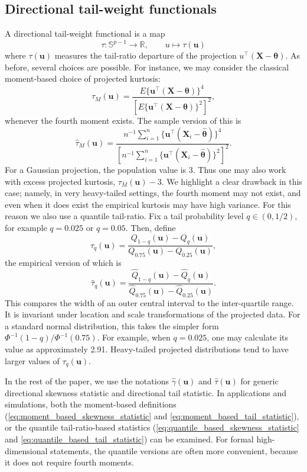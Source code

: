\documentclass[11pt]{article}
\theoremstyle{plain}
\theoremstyle{definition}
\theoremstyle{remark}
\def\X{\bm{X}}
\def\u{\bm{u}}
\newcommand{\boldtheta}{\bm{\theta}}
\begin{document}
\subsection{Directional tail-weight functionals}
\label{subsec:directional-tail}

A directional tail-weight functional is a map
\[
\tau:\mathbb{S}^{p-1}\to\mathbb R, \qquad u\mapsto \tau(\u)
\]
where \(\tau(\u)\) measures the tail-ratio departure of the projection
\(u^\top(\X-\boldtheta)\). As before, several choices are possible. For instance, we may consider the classical moment-based choice of projected kurtosis:
\[
\tau_{M}(\u)
=
\frac{
	E\{\u^\top(\X-\boldtheta)\}^4
}{
	\left[E\{\u^\top(\X-\boldtheta)\}^2\right]^2
},
\]
whenever the fourth moment exists. The sample version of this is
\begin{equation}
\label{eq:moment_based_tail_statistic}
    \widehat\tau_{M}(\u) = \frac{n^{-1}\sum_{i=1}^n \{\u^\top(\X_i-\widehat{\boldtheta})\}^4}
    {\left[n^{-1}\sum_{i=1}^n \{\u^\top(\X_i-\widehat{\boldtheta})\}^2\right]^2}.
\end{equation}
For a Gaussian projection, the population value is \(3\). Thus one may also work with excess projected kurtosis, \(\tau_{M}(\u)-3.\) We highlight a clear drawback in this case; namely, in very heavy-tailed settings, the fourth moment may not exist, and even when it does exist the empirical kurtosis may have high variance. For this reason we also use a quantile tail-ratio. Fix a tail probability level \(q\in(0,1/2)\), for example \(q=0.025\) or \(q=0.05\). Then, define
\[
\tau_q(\u)
=
\frac{
	Q_{1-q}(\u)-Q_q(\u)
}{
	Q_{0.75}(\u)-Q_{0.25}(\u)
},
\]
the empirical version of which is
\begin{equation}
\label{eq:quantile_based_tail_statistic}
    \widehat\tau_{q}(\u) = \frac{\widehat Q_{1-q}(\u)-\widehat Q_q(\u)}
    {\widehat Q_{0.75}(\u)-\widehat Q_{0.25}(\u)}.
\end{equation}
This compares the width of an outer central interval to the inter-quartile range. It is invariant under location and scale transformations of the projected data. For a standard normal distribution, this takes the simpler form $\Phi^{-1}(1-q)/\Phi^{-1}(0.75)$. For example, when \(q=0.025\), one may calculate its value as approximately 2.91. Heavy-tailed projected distributions tend to have larger values of \(\tau_q(\u)\).

In the rest of the paper, we use the notations $\widehat\gamma(\u)$ and \(\widehat\tau(\u)\) for generic directional skewness statistic and directional tail statistic. In applications and simulations, both the moment-based definitions (\eqref{eq:moment_based_skewness_statistic} and \eqref{eq:moment_based_tail_statistic}), or the quantile tail-ratio-based statistics (\eqref{eq:quantile_based_skewness_statistic} and \eqref{eq:quantile_based_tail_statistic}) can be examined. For formal high-dimensional statements, the quantile versions are often more convenient, because it does not require fourth moments.
\end{document}
